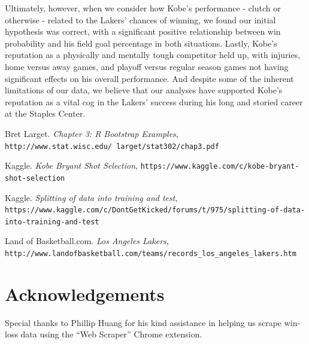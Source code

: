 \documentclass[paper=a4, fontsize=11pt]{scrartcl} %
\numberwithin{equation}{section} %
\numberwithin{figure}{section} %
\numberwithin{table}{section} %
\begin{document}
\hspace*{1cm}Ultimately, however, when we consider how Kobe's performance - clutch or otherwise - related to the Lakers' chances of winning, we found our initial hypothesis was correct, with a significant positive relationship between win probability and his field goal percentage in both situations. Lastly, Kobe's reputation as a physically and mentally tough competitor held up, with injuries, home versus away games, and playoff versus regular season games not having significant effects on his overall performance. And despite some of the inherent limitations of our data, we believe that our analyses have supported Kobe's reputation as a vital cog in the Lakers' success during his long and storied career at the Staples Center. 
\begin{thebibliography}{9}
	Bret Larget.
	\textit{Chapter 3: R Bootstrap Examples}, \\\texttt{http://www.stat.wisc.edu/~larget/stat302/chap3.pdf}
	
	Kaggle. 
	\textit{Kobe Bryant Shot Selection}, \texttt{https://www.kaggle.com/c/kobe-bryant-shot-selection}

	Kaggle. 
	\textit{Splitting of data into training and test},\\ \texttt{https://www.kaggle.com/c/DontGetKicked/forums/t/975/splitting-of-data-into-training-and-test}

	Land of Basketball.com.
	\textit{Los Angeles Lakers}, \\\texttt{http://www.landofbasketball.com/teams/records\_los\_angeles\_lakers.htm}
	


\end{thebibliography}
\section*{Acknowledgements}
\hspace*{1cm}Special thanks to Phillip Huang for his kind assistance in helping us scrape win-loss data using the ``Web Scraper'' Chrome extension.
\end{document}
